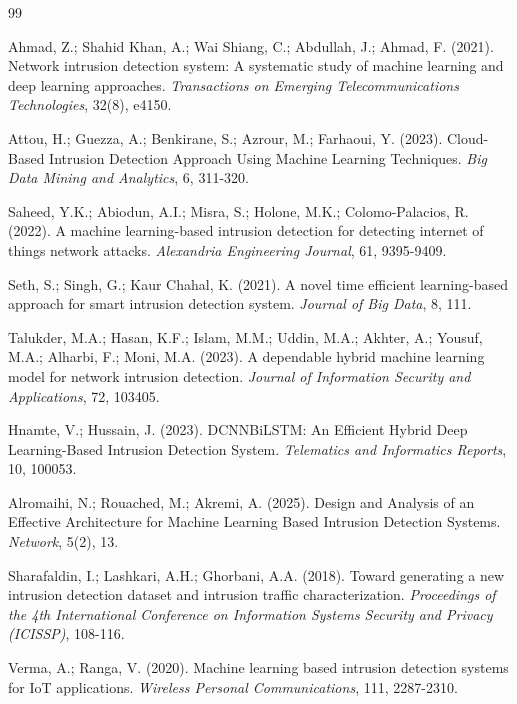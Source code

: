 \documentclass[12pt,a4paper]{article}
\begin{document}
\begin{thebibliography}{99}

Ahmad, Z.; Shahid Khan, A.; Wai Shiang, C.; Abdullah, J.; Ahmad, F. (2021).
Network intrusion detection system: A systematic study of machine learning and deep learning approaches.
\textit{Transactions on Emerging Telecommunications Technologies}, 32(8), e4150.

Attou, H.; Guezza, A.; Benkirane, S.; Azrour, M.; Farhaoui, Y. (2023).
Cloud-Based Intrusion Detection Approach Using Machine Learning Techniques.
\textit{Big Data Mining and Analytics}, 6, 311-320.

Saheed, Y.K.; Abiodun, A.I.; Misra, S.; Holone, M.K.; Colomo-Palacios, R. (2022).
A machine learning-based intrusion detection for detecting internet of things network attacks.
\textit{Alexandria Engineering Journal}, 61, 9395-9409.

Seth, S.; Singh, G.; Kaur Chahal, K. (2021).
A novel time efficient learning-based approach for smart intrusion detection system.
\textit{Journal of Big Data}, 8, 111.

Talukder, M.A.; Hasan, K.F.; Islam, M.M.; Uddin, M.A.; Akhter, A.; Yousuf, M.A.; Alharbi, F.; Moni, M.A. (2023).
A dependable hybrid machine learning model for network intrusion detection.
\textit{Journal of Information Security and Applications}, 72, 103405.

Hnamte, V.; Hussain, J. (2023).
DCNNBiLSTM: An Efficient Hybrid Deep Learning-Based Intrusion Detection System.
\textit{Telematics and Informatics Reports}, 10, 100053.

Alromaihi, N.; Rouached, M.; Akremi, A. (2025).
Design and Analysis of an Effective Architecture for Machine Learning Based Intrusion Detection Systems.
\textit{Network}, 5(2), 13.

Sharafaldin, I.; Lashkari, A.H.; Ghorbani, A.A. (2018).
Toward generating a new intrusion detection dataset and intrusion traffic characterization.
\textit{Proceedings of the 4th International Conference on Information Systems Security and Privacy (ICISSP)}, 108-116.

Verma, A.; Ranga, V. (2020).
Machine learning based intrusion detection systems for IoT applications.
\textit{Wireless Personal Communications}, 111, 2287-2310.


\end{thebibliography}
\end{document}
